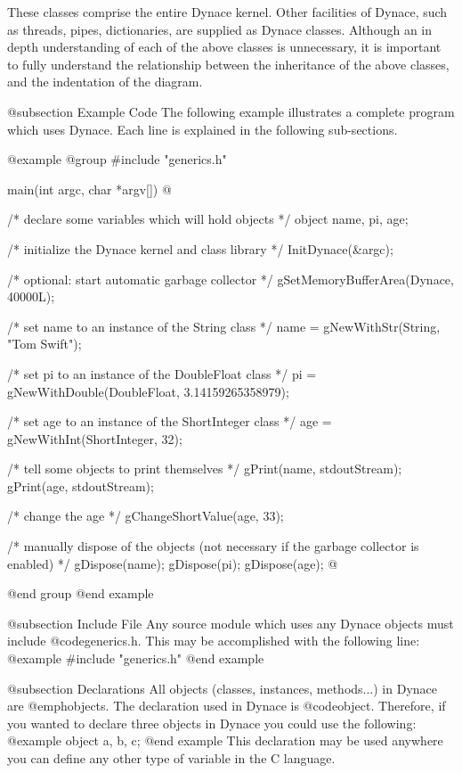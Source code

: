 These classes comprise the entire Dynace kernel.  Other facilities of Dynace,
such as threads, pipes, dictionaries, are supplied as Dynace classes.
Although an in depth understanding of each of the above classes is
unnecessary, it is important to fully understand the relationship between
the inheritance of the above classes, and the indentation of the diagram.

@subsection Example Code
The following example illustrates a complete program which uses Dynace.
Each line is explained in the following sub-sections.

@example
@group
#include "generics.h"

main(int argc, char *argv[])
@{
        /*  declare some variables which will hold objects  */
        object  name, pi, age;

        /*  initialize the Dynace kernel and class library  */
        InitDynace(&argc);

        /*  optional:  start automatic garbage collector  */
        gSetMemoryBufferArea(Dynace, 40000L);


        /*  set name to an instance of the String class  */
        name = gNewWithStr(String, "Tom Swift");

        /*  set pi to an instance of the DoubleFloat class  */
        pi   = gNewWithDouble(DoubleFloat, 3.14159265358979);

        /*  set age to an instance of the ShortInteger class  */
        age  = gNewWithInt(ShortInteger, 32);

        /*  tell some objects to print themselves  */
        gPrint(name, stdoutStream);
        gPrint(age, stdoutStream);

        /*  change the age  */
        gChangeShortValue(age, 33);
        


        /*  manually dispose of the objects (not necessary if the
            garbage collector is enabled)  */
        gDispose(name);
        gDispose(pi);
        gDispose(age);
@}
@end group
@end example

@subsection Include File
Any source module which uses any Dynace objects must include @code{generics.h}.
This may be accomplished with the following line:
@example
#include "generics.h"
@end example

@subsection Declarations
All objects (classes, instances, methods...) in Dynace are @emph{objects}.
The declaration used in Dynace is @code{object}.  Therefore, if you wanted
to declare three objects in Dynace you could use the following:
@example
        object   a, b, c;
@end example
This declaration may be used anywhere you can define any other type of
variable in the C language.


